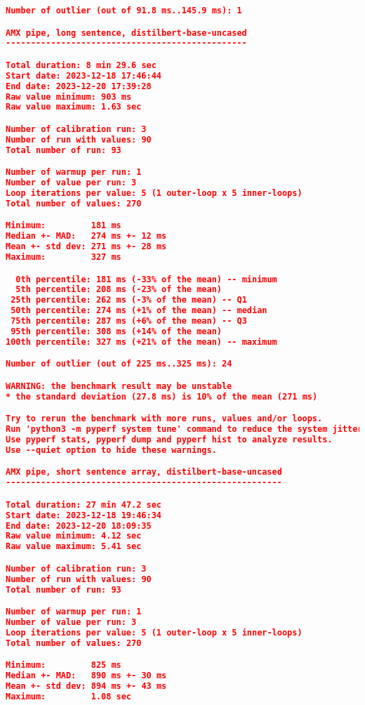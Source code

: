 \begin{lstlisting}[language=json]
Number of outlier (out of 91.8 ms..145.9 ms): 1

AMX pipe, long sentence, distilbert-base-uncased
------------------------------------------------

Total duration: 8 min 29.6 sec
Start date: 2023-12-18 17:46:44
End date: 2023-12-20 17:39:28
Raw value minimum: 903 ms
Raw value maximum: 1.63 sec

Number of calibration run: 3
Number of run with values: 90
Total number of run: 93

Number of warmup per run: 1
Number of value per run: 3
Loop iterations per value: 5 (1 outer-loop x 5 inner-loops)
Total number of values: 270

Minimum:         181 ms
Median +- MAD:   274 ms +- 12 ms
Mean +- std dev: 271 ms +- 28 ms
Maximum:         327 ms

  0th percentile: 181 ms (-33% of the mean) -- minimum
  5th percentile: 208 ms (-23% of the mean)
 25th percentile: 262 ms (-3% of the mean) -- Q1
 50th percentile: 274 ms (+1% of the mean) -- median
 75th percentile: 287 ms (+6% of the mean) -- Q3
 95th percentile: 308 ms (+14% of the mean)
100th percentile: 327 ms (+21% of the mean) -- maximum

Number of outlier (out of 225 ms..325 ms): 24

WARNING: the benchmark result may be unstable
* the standard deviation (27.8 ms) is 10% of the mean (271 ms)

Try to rerun the benchmark with more runs, values and/or loops.
Run 'python3 -m pyperf system tune' command to reduce the system jitter.
Use pyperf stats, pyperf dump and pyperf hist to analyze results.
Use --quiet option to hide these warnings.

AMX pipe, short sentence array, distilbert-base-uncased
-------------------------------------------------------

Total duration: 27 min 47.2 sec
Start date: 2023-12-18 19:46:34
End date: 2023-12-20 18:09:35
Raw value minimum: 4.12 sec
Raw value maximum: 5.41 sec

Number of calibration run: 3
Number of run with values: 90
Total number of run: 93

Number of warmup per run: 1
Number of value per run: 3
Loop iterations per value: 5 (1 outer-loop x 5 inner-loops)
Total number of values: 270

Minimum:         825 ms
Median +- MAD:   890 ms +- 30 ms
Mean +- std dev: 894 ms +- 43 ms
Maximum:         1.08 sec


\end{lstlisting}
